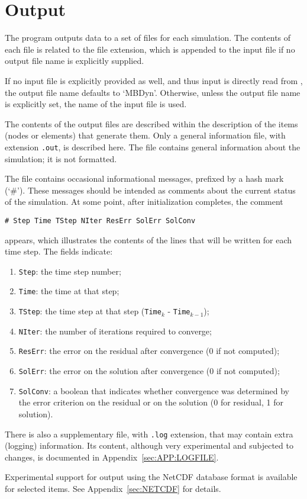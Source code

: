 \section{Output}
The program outputs data to a set of files for each simulation.
The contents of each file is related to the file extension,
which is appended to the input file if no output file name
is explicitly supplied.

If no input file is explicitly provided as well, and thus input
is directly read from , the output file name defaults
to `MBDyn'.
Otherwise, unless the output file name is explicitly set, the name
of the input file is used.

The contents of the output files are described within the description
of the items (nodes or elements) that generate them.
Only a general information file, with extension \texttt{.out},
is described here.
The file contains general information about the simulation;
it is not formatted.

The file contains occasional informational messages,
prefixed by a hash mark (`\#').
These messages should be intended as comments about the current status
of the simulation.
At some point, after initialization completes, the comment
\begin{verbatim}
# Step Time TStep NIter ResErr SolErr SolConv
\end{verbatim}
appears, which illustrates the contents of the lines that will be written
for each time step.
The fields indicate:
\begin{enumerate}
\item \texttt{Step}: the time step number;
\item \texttt{Time}: the time at that step;
\item \texttt{TStep}: the time step at that step
	(\texttt{Time}$_k$ - \texttt{Time}$_{k-1}$);
\item \texttt{NIter}: the number of iterations required to converge;
\item \texttt{ResErr}: the error on the residual after convergence
	(0 if not computed);
\item \texttt{SolErr}: the error on the solution after convergence
	(0 if not computed);
\item \texttt{SolConv}: a boolean that indicates whether convergence
	was determined by the error criterion on the residual
	or on the solution (0 for residual, 1 for solution).
\end{enumerate}

There is also a supplementary file, with \texttt{.log} extension,
that may contain extra (logging) information.
Its content, although very experimental and subjected to changes,
is documented in Appendix~\ref{sec:APP:LOGFILE}.

\bigskip

Experimental support for output using the NetCDF database format
is available for selected items.
See Appendix~\ref{sec:NETCDF} for details.
